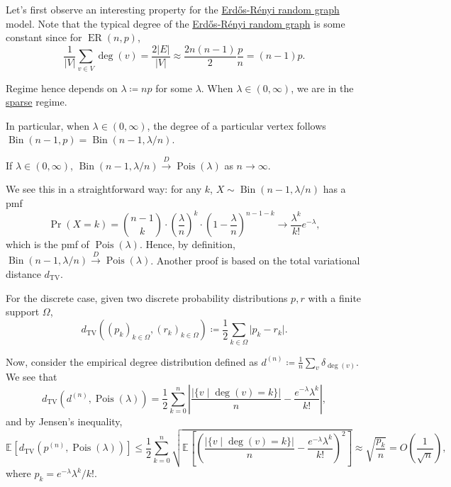 Let's first observe an interesting property for the \hyperref[def:Erdős-Rényi-random-graph]{Erdős-Rényi random graph} model. Note that the typical degree of the \hyperref[def:Erdős-Rényi-random-graph]{Erdős-Rényi random graph} is some constant since for \(\operatorname{ER}(n, p)\),
\[
	\frac{1}{\lvert V \rvert } \sum_{v \in V} \deg (v)
	= \frac{2 \lvert E \rvert }{\lvert V \rvert }
	\approx \frac{2 n (n-1)}{2} \frac{p}{n}
	= (n-1) p.
\]

\begin{note}
	Regime hence depends on \(\lambda \coloneqq np\) for some \(\lambda \). When \(\lambda \in (0, \infty )\), we are in the \hyperref[def:sparse-graph]{sparse} regime.
\end{note}

In particular, when \(\lambda \in (0, \infty )\), the degree of a particular vertex follows \(\operatorname{Bin}(n-1, p) = \operatorname{Bin}(n-1, \lambda / n) \).

\begin{claim}
	If \(\lambda \in (0, \infty )\), \(\operatorname{Bin}(n-1, \lambda / n) \overset{D}{\to} \operatorname{Pois}(\lambda ) \) as \(n \to \infty \).
\end{claim}
\begin{explanation}
	We see this in a straightforward way: for any \(k\), \(X \sim \operatorname{Bin}(n-1, \lambda / n) \) has a pmf
	\[
		\Pr_{}(X = k)
		= \binom{n-1}{k} \cdot \left( \frac{\lambda}{n} \right) ^{k} \cdot \left( 1 - \frac{\lambda}{n} \right) ^{n-1-k}
		\to \frac{\lambda ^k}{k!} e^{-\lambda },
	\]
	which is the pmf of \(\operatorname{Pois}(\lambda ) \). Hence, by definition, \(\operatorname{Bin}(n - 1, \lambda / n) \overset{D}{\to} \operatorname{Pois}(\lambda ) \). Another proof is based on the total variational distance \(d_{\mathrm{TV} }\).

	\begin{prev}
		For the discrete case, given two discrete probability distributions \(p, r\) with a finite support \(\Omega \),
		\[
			d_{\mathrm{TV} }((p_k)_{k \in \Omega }, (r_k)_{k \in \Omega })
			\coloneqq \frac{1}{2} \sum_{k \in \Omega } \lvert p_k - r_k \rvert.
		\]
	\end{prev}

	Now, consider the empirical degree distribution defined as \(d^{(n)} \coloneqq \frac{1}{n} \sum_{v} \delta _{\deg(v)}\). We see that
	\[
		d_{\mathrm{TV} } \left( d^{(n)} , \operatorname{Pois}(\lambda ) \right)
		= \frac{1}{2} \sum_{k=0}^{n} \left\lvert \frac{\lvert \{ v \mid \deg(v) = k \}  \rvert }{n} - \frac{e^{-\lambda } \lambda ^k}{k!} \right\rvert ,
	\]
	and by Jensen's inequality,
	\[
		\mathbb{E}_{}\left[d_{\mathrm{TV} } \left( p^{(n)} , \operatorname{Pois}(\lambda ) \right) \right]
		\leq \frac{1}{2} \sum_{k=0}^{n} \sqrt{ \mathbb{E}_{}\left[ \left( \frac{\lvert \{ v \mid \deg(v) = k \}  \rvert }{n} - \frac{e^{-\lambda } \lambda ^k}{k!} \right) ^2 \right] }
		\approx \sqrt{\frac{p_k}{n}}
		= O\left( \frac{1}{\sqrt{n} } \right) ,
	\]
	where \(p_k = e^{-\lambda } \lambda ^k / k!\).
\end{explanation}

